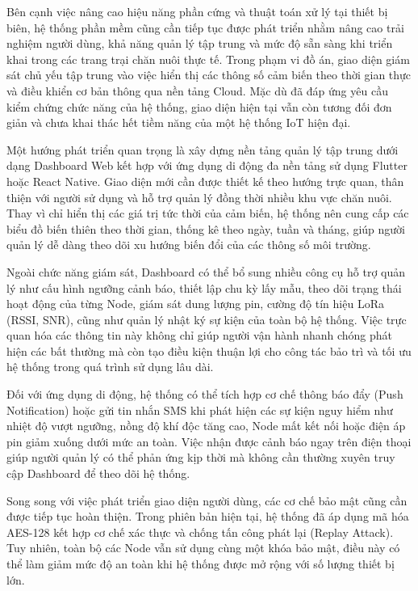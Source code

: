 Bên cạnh việc nâng cao hiệu năng phần cứng và thuật toán xử lý tại thiết bị biên, hệ thống phần mềm cũng cần tiếp tục được phát triển nhằm nâng cao trải nghiệm người dùng, khả năng quản lý tập trung và mức độ sẵn sàng khi triển khai trong các trang trại chăn nuôi thực tế. Trong phạm vi đồ án, giao diện giám sát chủ yếu tập trung vào việc hiển thị các thông số cảm biến theo thời gian thực và điều khiển cơ bản thông qua nền tảng Cloud. Mặc dù đã đáp ứng yêu cầu kiểm chứng chức năng của hệ thống, giao diện hiện tại vẫn còn tương đối đơn giản và chưa khai thác hết tiềm năng của một hệ thống IoT hiện đại.

Một hướng phát triển quan trọng là xây dựng nền tảng quản lý tập trung dưới dạng Dashboard Web kết hợp với ứng dụng di động đa nền tảng sử dụng Flutter hoặc React Native. Giao diện mới cần được thiết kế theo hướng trực quan, thân thiện với người sử dụng và hỗ trợ quản lý đồng thời nhiều khu vực chăn nuôi. Thay vì chỉ hiển thị các giá trị tức thời của cảm biến, hệ thống nên cung cấp các biểu đồ biến thiên theo thời gian, thống kê theo ngày, tuần và tháng, giúp người quản lý dễ dàng theo dõi xu hướng biến đổi của các thông số môi trường.

Ngoài chức năng giám sát, Dashboard có thể bổ sung nhiều công cụ hỗ trợ quản lý như cấu hình ngưỡng cảnh báo, thiết lập chu kỳ lấy mẫu, theo dõi trạng thái hoạt động của từng Node, giám sát dung lượng pin, cường độ tín hiệu LoRa (RSSI, SNR), cũng như quản lý nhật ký sự kiện của toàn bộ hệ thống. Việc trực quan hóa các thông tin này không chỉ giúp người vận hành nhanh chóng phát hiện các bất thường mà còn tạo điều kiện thuận lợi cho công tác bảo trì và tối ưu hệ thống trong quá trình sử dụng lâu dài.

Đối với ứng dụng di động, hệ thống có thể tích hợp cơ chế thông báo đẩy (Push Notification) hoặc gửi tin nhắn SMS khi phát hiện các sự kiện nguy hiểm như nhiệt độ vượt ngưỡng, nồng độ khí độc tăng cao, Node mất kết nối hoặc điện áp pin giảm xuống dưới mức an toàn. Việc nhận được cảnh báo ngay trên điện thoại giúp người quản lý có thể phản ứng kịp thời mà không cần thường xuyên truy cập Dashboard để theo dõi hệ thống.

Song song với việc phát triển giao diện người dùng, các cơ chế bảo mật cũng cần được tiếp tục hoàn thiện. Trong phiên bản hiện tại, hệ thống đã áp dụng mã hóa AES-128 kết hợp cơ chế xác thực và chống tấn công phát lại (Replay Attack). Tuy nhiên, toàn bộ các Node vẫn sử dụng cùng một khóa bảo mật, điều này có thể làm giảm mức độ an toàn khi hệ thống được mở rộng với số lượng thiết bị lớn.


